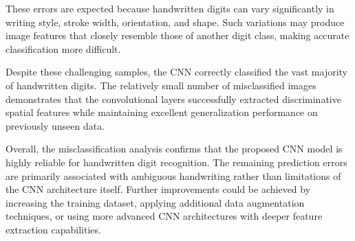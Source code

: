 These errors are expected because handwritten digits can vary significantly in writing style, stroke width, orientation, and shape. Such variations may produce image features that closely resemble those of another digit class, making accurate classification more difficult.

Despite these challenging samples, the CNN correctly classified the vast majority of handwritten digits. The relatively small number of misclassified images demonstrates that the convolutional layers successfully extracted discriminative spatial features while maintaining excellent generalization performance on previously unseen data.

Overall, the misclassification analysis confirms that the proposed CNN model is highly reliable for handwritten digit recognition. The remaining prediction errors are primarily associated with ambiguous handwriting rather than limitations of the CNN architecture itself. Further improvements could be achieved by increasing the training dataset, applying additional data augmentation techniques, or using more advanced CNN architectures with deeper feature extraction capabilities.